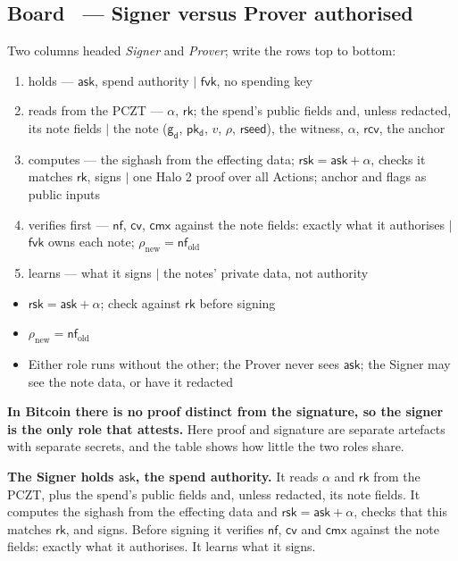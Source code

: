 \documentclass[11pt,a4paper]{article}
\makeatletter
\newcommand{\nfsym}{\ensuremath{\mathsf{nf}}}
\newcommand{\cmx}{\ensuremath{\mathsf{cmx}}}
\newcommand{\cvsym}{\ensuremath{\mathsf{cv}}}
\newcommand{\rksym}{\ensuremath{\mathsf{rk}}}
\newcommand{\gd}{\ensuremath{\mathsf{g_d}}}
\newcommand{\pkd}{\ensuremath{\mathsf{pk_d}}}
\newcommand{\asksym}{\ensuremath{\mathsf{ask}}}
\newcommand{\fvk}{\ensuremath{\mathsf{fvk}}}
\newcommand{\rcv}{\ensuremath{\mathsf{rcv}}}
\newcommand{\rsk}{\ensuremath{\mathsf{rsk}}}
\newcounter{board}
\newenvironment{board}[2]{\stepcounter{board}%
  \subsection*{Board \theboard\ --- #1 \hfill {\normalfont\small\color{arb}#2}}}{\medskip}
\newcommand{\Draw}{\draw@head{Draw}}
\newcommand{\Write}{\draw@head{Write}}
\newcommand{\Say}{\draw@head{Say}}
\makeatother
\begin{document}
\begin{board}{Signer versus Prover}{authorised}
\Draw
Two columns headed \emph{Signer} and \emph{Prover}; write the rows top to
bottom:
\begin{enumerate}
  \item holds --- \asksym{}, spend authority $\mid$ \fvk{}, no spending
    key
  \item reads from the PCZT --- $\alpha$, \rksym; the spend's public
    fields and, unless redacted, its note fields $\mid$ the note ($\gd$,
    $\pkd$, $v$, $\rho$, $\mathsf{rseed}$), the witness, $\alpha$, \rcv,
    the anchor
  \item computes --- the sighash from the effecting data; $\rsk = \asksym
    + \alpha$, checks it matches \rksym, signs $\mid$ one Halo 2 proof
    over all Actions; anchor and flags as public inputs
  \item verifies first --- $\nfsym$, $\cvsym$, $\cmx$ against the note
    fields: exactly what it authorises $\mid$ \fvk{} owns each note;
    $\rho_{\mathrm{new}} = \nfsym_{\mathrm{old}}$
  \item learns --- what it signs $\mid$ the notes' private data, not
    authority
\end{enumerate}
\Write
\begin{itemize}
  \item $\rsk = \asksym + \alpha$; check against \rksym{} before signing
  \item $\rho_{\mathrm{new}} = \nfsym_{\mathrm{old}}$
  \item Either role runs without the other; the Prover never sees
    \asksym; the Signer may see the note data, or have it redacted
\end{itemize}
\Say
\textbf{In Bitcoin there is no proof distinct from the signature, so the
signer is the only role that attests.} Here proof and signature are
separate artefacts with separate secrets, and the table shows how little
the two roles share.

\textbf{The Signer holds \asksym, the spend authority.} It reads $\alpha$
and \rksym{} from the PCZT, plus the spend's public fields and, unless
redacted, its note fields. It computes the sighash from the effecting
data and $\rsk = \asksym + \alpha$, checks that this matches \rksym, and
signs. Before signing it verifies $\nfsym$, $\cvsym$ and $\cmx$ against
the note fields: exactly what it authorises. It learns what it signs.


\end{board}
\end{document}
